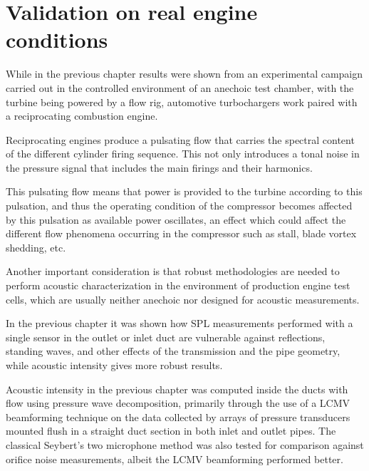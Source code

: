 \chapter{Validation on real engine conditions}
\label{cap:engine}

While in the previous chapter results were shown from an experimental campaign carried out in the controlled environment of an anechoic test chamber, with the turbine being powered by a flow rig, automotive turbochargers work paired with a reciprocating combustion engine.

Reciprocating engines produce a pulsating flow that carries the spectral content of the different cylinder firing sequence. This not only introduces a tonal noise in the pressure signal that includes the main firings and their harmonics.

This pulsating flow means that power is provided to the turbine according to this pulsation, and thus the operating condition of the compressor becomes affected by this pulsation as available power oscillates, an effect which could affect the different flow phenomena occurring in the compressor such as stall, blade vortex shedding, etc.

Another important consideration is that robust methodologies are needed to perform acoustic characterization in the environment of production engine test cells, which are usually neither anechoic nor designed for acoustic measurements.

In the previous chapter it was shown how SPL measurements performed with a single sensor in the outlet or inlet duct are vulnerable against reflections, standing waves, and other effects of the transmission and the pipe geometry, while acoustic intensity gives more robust results.

Acoustic intensity in the previous chapter was computed inside the ducts with flow using pressure wave decomposition, primarily through the use of a LCMV beamforming technique on the data collected by arrays of pressure transducers mounted flush in a straight duct section in both inlet and outlet pipes. The classical Seybert's two microphone method \cite{seybert1988two} was also tested for comparison against orifice noise measurements, albeit the LCMV beamforming performed better.


